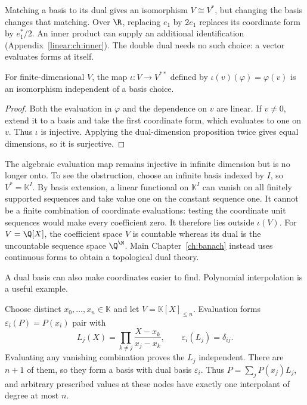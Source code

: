 Matching a basis to its dual gives an isomorphism $V\cong V^*$, but changing the basis changes that matching. Over $\R$, replacing $e_1$ by $2e_1$ replaces its coordinate form by $e_1^*/2$. An inner product can supply an additional identification (Appendix~\ref{linear:ch:inner}). The double dual needs no such choice: a vector evaluates forms at itself.

\begin{theorem}\label{linear:thm:bidual}
For finite-dimensional $V$, the map $\iota:V\to V^{**}$ defined by $\iota(v)(\varphi)=\varphi(v)$ is an isomorphism independent of a basis choice.
\end{theorem}
\begin{proof}
Both the evaluation in $\varphi$ and the dependence on $v$ are linear. If $v\ne0$, extend it to a basis and take the first coordinate form, which evaluates to one on $v$. Thus $\iota$ is injective. Applying the dual-dimension proposition twice gives equal dimensions, so it is surjective.
\end{proof}

\begin{remark}
The algebraic evaluation map remains injective in infinite dimension but is no longer onto. To see the obstruction, choose an infinite basis indexed by $I$, so $V^*=\mathbb K^I$. By basis extension, a linear functional on $\mathbb K^I$ can vanish on all finitely supported sequences and take value one on the constant sequence one. It cannot be a finite combination of coordinate evaluations: testing the coordinate unit sequences would make every coefficient zero. It therefore lies outside $\iota(V)$. For $V=\Q[X]$, the coefficient space $V$ is countable whereas its dual is the uncountable sequence space $\Q^{\N}$. Main Chapter~\ref{ch:banach} instead uses continuous forms to obtain a topological dual theory.
\end{remark}

A dual basis can also make coordinates easier to find. Polynomial interpolation is a useful example.

\begin{example}\label{linear:ex:lagrange}
Choose distinct $x_0,\ldots,x_n\in\mathbb K$ and let $V=\mathbb K[X]_{\le n}$. Evaluation forms $\varepsilon_i(P)=P(x_i)$ pair with
\[L_j(X)=\prod_{k\ne j}\frac{X-x_k}{x_j-x_k},\qquad\varepsilon_i(L_j)=\delta_{ij}.
\]
Evaluating any vanishing combination proves the $L_j$ independent. There are $n+1$ of them, so they form a basis with dual basis $\varepsilon_i$. Thus $P=\sum_jP(x_j)L_j$, and arbitrary prescribed values at these nodes have exactly one interpolant of degree at most $n$.
\end{example}

